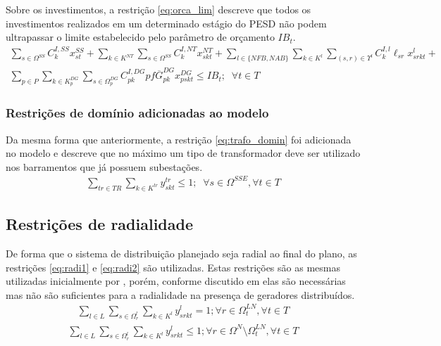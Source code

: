 Sobre os investimentos, a restrição \eqref{eq:orca_lim} descreve que todos os investimentos realizados em um determinado estágio do \ac{PESD} não podem ultrapassar o limite estabelecido pelo parâmetro de orçamento $IB_t$.
\begin{align}
\sum_{s \in \Omega^{SS}} C^{I,SS}_{k} x^{SS}_{st} + \sum_{k \in K^{NT}} \sum_{s \in \Omega^{SS}} C^{I,NT}_{k} x^{NT}_{skt} +
\sum_{l\in \{NFB,NAB\}} \sum_{k \in K^l} \sum_{(s,r) \in \Upsilon^l} C^{I,l}_{k} \ell_{sr}x^l_{srkt} +\nonumber\\
\sum_{p\in P}\sum_{k\in K^{DG}_p} \sum_{s \in \Omega^{DG}_p} C^{I,DG}_{pk} pf\overline{G}^{DG}_{pk} x^{DG}_{pskt} \leq IB_t; \; \;\forall t \in T
\label{eq:orca_lim}
\end{align}

\subsubsection*{Restrições de domínio adicionadas ao modelo}

Da mesma forma que anteriormente, a restrição \eqref{eq:trafo_domin} foi adicionada no modelo e descreve que no máximo um tipo de transformador deve ser utilizado nos barramentos que já possuem subestações.
\begin{align}
    \sum_{tr \in TR} \sum_{k \in K^{tr}} y^{tr}_{skt} \leq 1 ; \;\; \forall s \in \Omega^{SSE} , \forall t \in T
    \label{eq:trafo_domin}
\end{align}

\subsection{Restrições de radialidade}

De forma que o sistema de distribuição planejado seja radial ao final do plano, as restrições \eqref{eq:radi1} e \eqref{eq:radi2} são utilizadas. Estas restrições são as mesmas utilizadas inicialmente por , porém, conforme discutido em  elas são necessárias mas não são suficientes para a radialidade na presença de geradores distribuídos.
\begin{align}
    \sum_{l \in L}\sum_{s \in \Omega^l_r}\sum_{k \in K^l} y^l_{srkt} = 1; \forall r \in \Omega^{LN}_t, \forall t \in T
    \label{eq:radi1}
\end{align}
\begin{align}
    \sum_{l \in L}\sum_{s \in \Omega^l_r}\sum_{k \in K^l} y^l_{srkt} \leq 1; \forall r \in \Omega^{N} \setminus \Omega^{LN}_t, \forall t \in T
    \label{eq:radi2}
\end{align}

